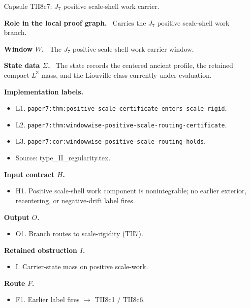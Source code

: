 \documentclass[11pt]{amsart}
\newcommand{\capsulefield}[1]{\par\smallskip\noindent\textbf{#1.}\ }
\begin{document}
\begin{proofcapsule}{Capsule TII8c7: $J_7$ positive scale-shell work carrier.}
  \capsulefield{Role in the local proof graph}
  Carries the \(J_7\) positive scale-shell work branch.

  \capsulefield{Window \(W\)}
The $J_7$ positive scale-shell work carrier window.

  \capsulefield{State data \(\Sigma\)}
The state records the centered ancient profile, the retained compact $L^3$ mass, and the Liouville class currently under evaluation.

  \capsulefield{Implementation labels}
  \begin{itemize}[leftmargin=1.8em]
  \item L1. \texttt{paper7:thm:positive-scale-certificate-enters-scale-rigid}.
  \item L2. \texttt{paper7:thm:windowwise-positive-scale-routing-certificate}.
  \item L3. \texttt{paper7:cor:windowwise-positive-scale-routing-holds}.
  \item Source: type\_II\_regularity.tex.
  \end{itemize}

  \capsulefield{Input contract \(H\)}
  \begin{itemize}[leftmargin=1.8em]
  \item H1. Positive scale-shell work component is nonintegrable; no earlier exterior, recentering, or negative-drift label fires.
  \end{itemize}

  \capsulefield{Output \(O\)}
  \begin{itemize}[leftmargin=1.8em]
  \item O1. Branch routes to scale-rigidity (TII7).
  \end{itemize}

  \capsulefield{Retained obstruction \(I\)}
  \begin{itemize}[leftmargin=1.8em]
  \item I. Carrier-state mass on positive scale-work.
  \end{itemize}

  \capsulefield{Route \(F\)}
  \begin{itemize}[leftmargin=1.8em]
  \item F1. Earlier label fires $\to$ TII8c1 / TII8c6.
  \end{itemize}


\end{proofcapsule}
\end{document}
